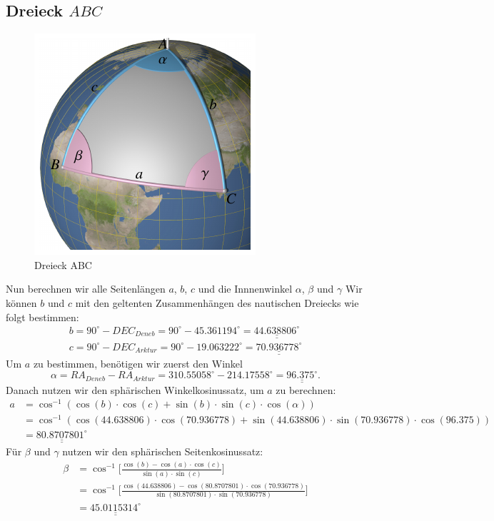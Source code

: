 \subsection{Dreieck $ABC$}
\begin{figure}
	\includegraphics{papers/nav/bilder/position2.pdf}
	\caption{Dreieck ABC}
\end{figure}
Nun berechnen wir alle Seitenlängen $a$, $b$, $c$ und die Innnenwinkel $\alpha$, $\beta$ und $\gamma$
Wir können $b$ und $c$ mit den geltenten Zusammenhängen des nautischen Dreiecks wie folgt bestimmen:
\begin{align}
	b=90^\circ-DEC_{Deneb} = 90^\circ - 45.361194^\circ = \underline{\underline{44.638806^\circ}}\nonumber \\
	c=90^\circ-DEC_{Arktur} = 90^\circ - 19.063222^\circ = \underline{\underline{70.936778^\circ}} \nonumber 
\end{align}
Um $a$ zu bestimmen, benötigen wir zuerst den Winkel \[\alpha= RA_{Deneb} - RA_{Arktur} = 310.55058^\circ -214.17558^\circ = \underline{\underline{96.375^\circ}}.\]
Danach nutzen wir den sphärischen Winkelkosinussatz, um  $a$ zu berechnen:
\begin{align}
	a &= \cos^{-1}(\cos(b) \cdot \cos(c) + \sin(b) \cdot \sin(c) \cdot \cos(\alpha)) \nonumber \\
	 &= \cos^{-1}(\cos(44.638806) \cdot \cos(70.936778) + \sin(44.638806) \cdot \sin(70.936778) \cdot \cos(96.375)) \nonumber \\
	 &= \underline{\underline{80.8707801^\circ}} \nonumber
\end{align}
Für $\beta$ und $\gamma$ nutzen wir den sphärischen Seitenkosinussatz:
\begin{align}
	\beta &= \cos^{-1}  \bigg[\frac{\cos(b)-\cos(a) \cdot \cos(c)}{\sin(a) \cdot \sin(c)}\bigg] \nonumber \\
	&= \cos^{-1}  \bigg[\frac{\cos(44.638806)-\cos(80.8707801) \cdot \cos(70.936778)}{\sin(80.8707801) \cdot \sin(70.936778)}\bigg] \nonumber \\
	&= \underline{\underline{45.0115314^\circ}} \nonumber
\end{align}

